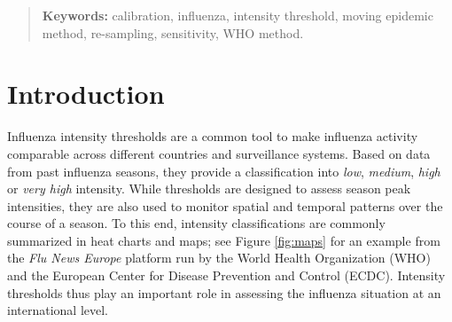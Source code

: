 \documentclass{article}
\begin{document}
\bigskip

\begin{quote}
\textbf{Keywords:} calibration, influenza, intensity threshold, moving epidemic method, re-sampling, sensitivity, WHO method.
\end{quote}

\newpage

%




\section{Introduction}

Influenza intensity thresholds are a common tool to make influenza activity comparable across different countries and surveillance systems. Based on data from past influenza seasons, they provide a classification into \textit{low}, \textit{medium}, \textit{high} or \textit{very high} intensity. While thresholds are designed to assess season peak intensities, they are also used to monitor spatial and temporal patterns over the course of a season. To this end, intensity classifications are commonly summarized in heat charts and maps; see Figure \ref{fig:maps} for an example from the \textit{Flu News Europe} platform run by the World Health Organization (WHO) and the European Center for Disease Prevention and Control (ECDC). Intensity thresholds thus play an important role in assessing the influenza situation at an international level.
\end{document}
